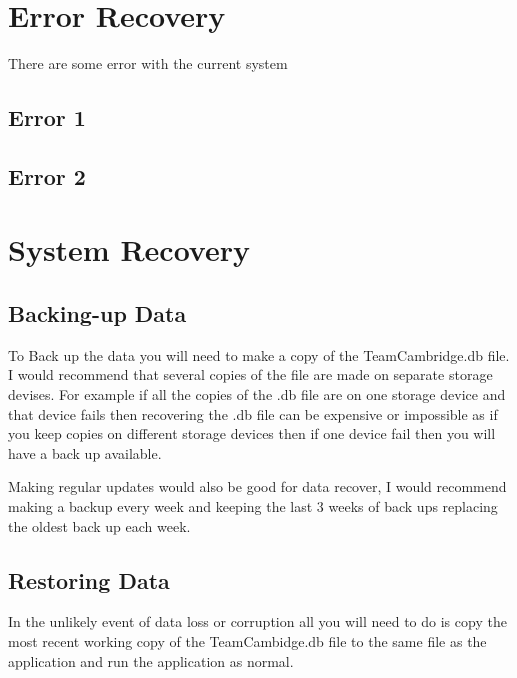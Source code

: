 \section{Error Recovery}
There are some error with the current system 
\subsection{Error 1}

\subsection{Error 2}

\section{System Recovery}

\subsection{Backing-up Data}
To Back up the data you will need to make a copy of the TeamCambridge.db file. I would recommend that several copies of the file are made on separate storage devises. For example if all the copies of the .db file are on one storage device and that device fails then recovering the .db file can be expensive or impossible as if you keep copies on different storage devices then if one device fail then you will have a back up available.

Making regular updates would also be good for data recover, I would recommend making a backup every week and keeping the last 3 weeks of back ups replacing the oldest back up each week. 
\subsection{Restoring Data}
In the unlikely event of data loss or corruption all you will need to do is copy the most recent working copy of the TeamCambidge.db file to the same file as the application and run the application as normal.

\stopcontents[UserManual]
